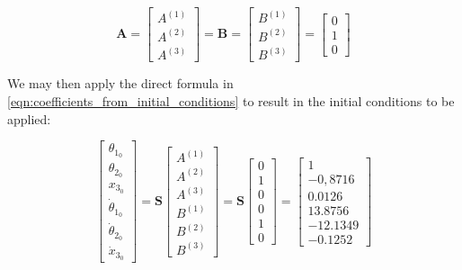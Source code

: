 \documentclass[a4paper,12pt,oneside]{article}
\begin{document}
\[
	\mathbf{A} = \begin{bmatrix}
									A^{(1)} \\
									A^{(2)} \\
									A^{(3)}
								\end{bmatrix} = \mathbf{B} =	\begin{bmatrix}
																								B^{(1)} \\
																								B^{(2)} \\
																								B^{(3)}
																							\end{bmatrix} = \begin{bmatrix}
																																0 \\
																																1 \\
																																0
																															\end{bmatrix}
\]

We may then apply the direct formula in \eqref{eqn:coefficients_from_initial_conditions} to result in the initial conditions to be applied:

\[
	\begin{bmatrix}
		\theta_{1_0} \\
		\theta_{2_0} \\
		x_{3_0}	\\
		\dot{\theta}_{1_0} \\
		\dot{\theta}_{2_0} \\
		\dot{x}_{3_0}
	\end{bmatrix} = \mathbf{S}	\begin{bmatrix}
																A^{(1)} \\
																A^{(2)} \\
																A^{(3)} \\
																B^{(1)}	\\
																B^{(2)}	\\
																B^{(3)}
															\end{bmatrix} =
		\mathbf{S}	\begin{bmatrix}
									0 \\
									1 \\
									0 \\
									0 \\
									1 \\
									0
								\end{bmatrix} = \begin{bmatrix}
																	1 \\
																	-0,8716 \\
																	0.0126 \\
																	13.8756 \\
																	-12.1349 \\
																	-0.1252
																\end{bmatrix}
\]
\end{document}
